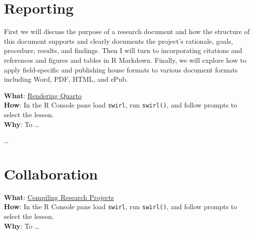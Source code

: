 \documentclass[
  letterpaper,
]{latex/krantz}
\begin{document}
\hypertarget{sec-reporting}{%
\chapter{Reporting}\label{sec-reporting}}

First we will discuss the purpose of a research document and how the
structure of this document supports and clearly documents the project's
rationale, goals, procedure, results, and findings. Then I will turn to
incorporating citations and references and figures and tables in R
Markdown. Finally, we will explore how to apply field-specific and
publishing house formats to various document formats including Word,
PDF, HTML, and ePub.

\begin{tcolorbox}[enhanced jigsaw, toprule=.15mm, bottomtitle=1mm, coltitle=black, title=\textcolor{quarto-callout-tip-color}{\faLightbulb}\hspace{0.5em}{Swirl}, left=2mm, colframe=quarto-callout-tip-color-frame, bottomrule=.15mm, colbacktitle=quarto-callout-tip-color!10!white, leftrule=.75mm, colback=white, titlerule=0mm, breakable, toptitle=1mm, opacityback=0, arc=.35mm, rightrule=.15mm, opacitybacktitle=0.6]

\textbf{What}: \href{https://github.com/lin380/swirl}{Rendering
Quarto}\\
\textbf{How}: In the R Console pane load \texttt{swirl}, run
\texttt{swirl()}, and follow prompts to select the lesson.\\
\textbf{Why}: To \ldots{}

\end{tcolorbox}

\ldots{}

\hypertarget{sec-collaboration}{%
\chapter{Collaboration}\label{sec-collaboration}}

\begin{tcolorbox}[enhanced jigsaw, toprule=.15mm, bottomtitle=1mm, coltitle=black, title=\textcolor{quarto-callout-tip-color}{\faLightbulb}\hspace{0.5em}{Swirl}, left=2mm, colframe=quarto-callout-tip-color-frame, bottomrule=.15mm, colbacktitle=quarto-callout-tip-color!10!white, leftrule=.75mm, colback=white, titlerule=0mm, breakable, toptitle=1mm, opacityback=0, arc=.35mm, rightrule=.15mm, opacitybacktitle=0.6]

\textbf{What}: \href{https://github.com/lin380/swirl}{Compiling Research
Projects}\\
\textbf{How}: In the R Console pane load \texttt{swirl}, run
\texttt{swirl()}, and follow prompts to select the lesson.\\
\textbf{Why}: To \ldots{}

\end{tcolorbox}
\end{document}
